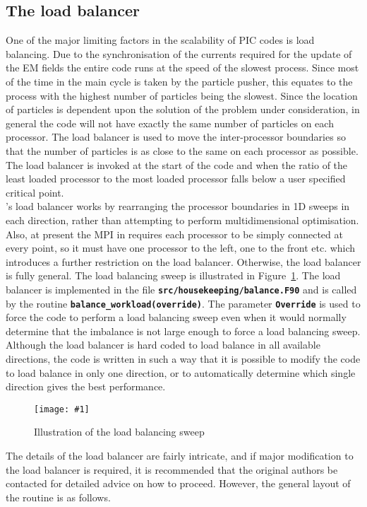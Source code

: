 \documentclass[12pt,a4paper]{article}
\newcommand{\inlinecode}[1]{{\color{warwickred} \bf\texttt{#1}}}
\newcommand{\EPOCH}{{\color{warwickdark}\fontfamily{phv}\selectfont{EPOCH}}}
\newcommand{\captionedimage}[3]
  {{\begin{figure}[hbt!]\centering\texttt{[image: \#1]}\caption{#3}\label{#2}
    \end{figure}}}
\begin{document}
\pagebreak

\subsection{The load balancer}
One of the major limiting factors in the scalability of PIC codes is load
balancing. Due to the synchronisation of the currents required for the update
of the EM fields the entire code runs at the speed of the slowest
process. Since most of the time in the main {\EPOCH} cycle is taken by the
particle pusher, this equates to the process with the highest number of particles
being the slowest. Since the location of particles is dependent upon the
solution of the problem under consideration, in general the code will not have
exactly the same number of particles on each processor. The load balancer is
used to move the inter-processor boundaries so that the number of particles is
as close to the same on each processor as possible. The load balancer is
invoked at the start of the code and when the ratio of the least loaded
processor to the most loaded processor falls below a user specified critical
point.\\

{\EPOCH}'s load balancer works by rearranging the processor boundaries in 1D
sweeps in each direction, rather than attempting to perform multidimensional
optimisation. Also, at present the MPI in {\EPOCH} requires each processor to be
simply connected at every point, so it must have one processor to the left, one
to the front etc. which introduces a further restriction on the load
balancer. Otherwise, the load balancer is fully general. The load balancing
sweep is illustrated in Figure~\ref{sweep}.
The load balancer is
implemented in the file \inlinecode{src/housekeeping/balance.F90} and is called
by the routine \inlinecode{balance\_workload(override)}. The parameter
\inlinecode{Override} is used to force the code to perform a load balancing
sweep even when it would normally determine that the imbalance is not large
enough to force a load balancing sweep. Although the load balancer is hard
coded to load balance in all available directions, the code is written in such
a way that it is possible to modify the code to load balance in only one
direction, or to automatically determine which single direction gives the best
performance.

\captionedimage{./images/sweep}{sweep}{Illustration of the load balancing sweep}

The details of the load balancer are fairly intricate, and if major
modification to the load balancer is required, it is recommended that the
original authors be contacted for detailed advice on how to proceed. However,
the general layout of the routine is as follows.
\end{document}

